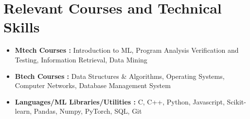 \documentclass[10.8pt, a4paper]{extarticle}
\newcommand{\shorterSection}[1]{\vspace{-10pt}\section{#1}}
\begin{document}


\shorterSection{Relevant Courses and Technical Skills}
\begin{itemize}
\item \textbf{Mtech Courses :} Introduction to ML, Program Analysis Verification and Testing, Information Retrieval, Data Mining
\item \textbf{Btech Courses :} Data Structures \& Algorithms, Operating Systems, Computer Networks, Database Management System
\item \textbf{Languages/ML Libraries/Utilities :} C, C++, Python, Javascript, Scikit-learn, Pandas, Numpy, PyTorch, SQL, Git
\end{itemize}


\end{document}
